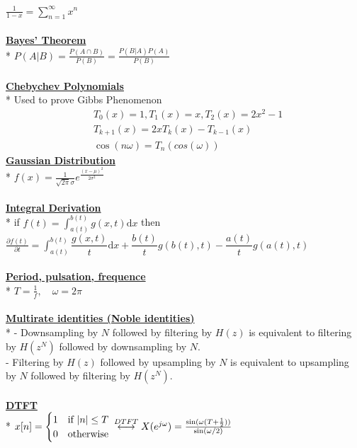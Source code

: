 \documentclass{article}
\newcommand{\para}[1]{\textbf{\underline{#1}}\\*} %
\newcommand{\difrac}[2]{\frac{\partial #1}{\partial #2}}
\begin{document}
\begin{multicols}{3}
$\frac1{1-x} = \sum_{n=1}^{\infty} x^n$
\\\\\para{Bayes' Theorem}
$P(A|B) = \frac{P(A \cap B)}{P(B)} = \frac{P(B|A)P(A)}{P(B)}$
\\\\\para{Chebychev Polynomials}
Used to prove Gibbs Phenomenon
\begin{align*}
&T_0(x) =1, T_1(x) = x, T_2(x) = 2x^2-1\\
&T_{k+1}(x) = 2xT_k(x)-T_{k-1}(x)\\
&\cos(n\omega) = T_n(cos(\omega)) 
\end{align*}
\para{Gaussian Distribution}
$f(x) = \frac{1}{\sqrt{2\pi}\sigma} e^\frac{(x-\mu)^2}{2\sigma^2}$
\\\\\para{Integral Derivation}
if $\displaystyle f(t) =\int_{a(t)}^{b(t)} g(x,t)\mathrm dx$ then \\
$\displaystyle \difrac{f(t)}t = \int_{a(t)}^{b(t)} \dfrac{g(x,t)}t \mathrm dx + \dfrac{b(t)}t g(b(t), t) - \dfrac{a(t)}t g(a(t), t)$
\\\\\para{Period, pulsation, frequence}
$ T = \frac1f, \quad \omega = 2\pi$
\\\\\para{Multirate identities (Noble identities)}
- Downsampling by $N$ followed by filtering by $H(z)$ is equivalent to filtering by $H(z^N)$
followed by downsampling by $N$.\\
- Filtering by $H(z)$ followed by upsampling by $N$ is equivalent to upsampling by $N$
followed by filtering by $H(z^N)$.
\\\\\para{DTFT}
$x[n]=  \begin{cases}1 & \text{if } |n|\leq T \\ 0 & \text{otherwise} \end{cases}
\\\overset{DTFT}{\longleftrightarrow} X(e^{j\omega} ) =\frac{\sin (\omega(T + \frac12) )}{\sin (\omega/2)} $
\end{multicols}
\end{document}
